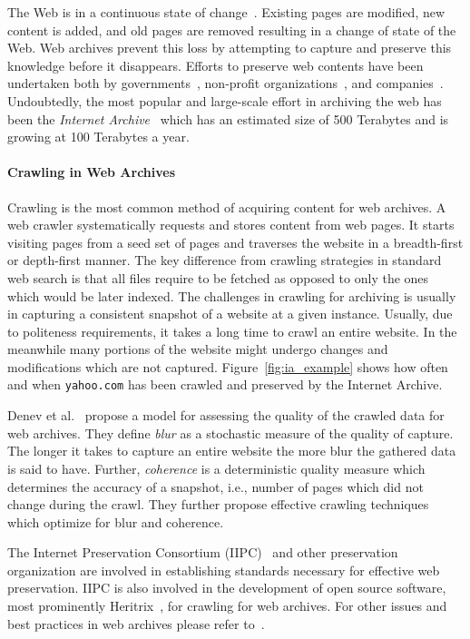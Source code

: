 The Web is in a continuous state of change~\cite{1498837,Cho, 775246}. Existing pages are modified, new content is added, and old pages are removed resulting in a change of state of the Web. Web archives prevent this loss by attempting to capture and preserve this knowledge before it disappears. Efforts to preserve web contents have been undertaken both by governments~\cite{webarchive,netarkivet,bnf,pandora}, non-profit organizations~\cite{IA, IM}, and companies~\cite{HANZO}. Undoubtedly, the most popular and large-scale effort in archiving the web has been the \emph{Internet Archive}~\cite{IA} which has an estimated size of 500 Terabytes and is growing at 100 Terabytes a year. 


\paragraph{Crawling in Web Archives} Crawling is the most common method of acquiring content for web archives. A web crawler systematically requests and stores content from web pages. It starts visiting pages from a seed set of pages and traverses the website in a breadth-first or depth-first manner. The key difference from crawling strategies in standard web search is that all files require to be fetched as opposed to only the ones which would be later indexed. The challenges in crawling for archiving is usually in capturing a consistent snapshot of a website at a given instance. Usually, due to politeness requirements, it takes a long time to crawl an entire website. In the meanwhile many portions of the website might undergo changes and modifications which are not captured. Figure~\ref{fig:ia_example} shows how often and when \texttt{yahoo.com} has been crawled and preserved by the Internet Archive.

Denev et al.~\cite{denev2011sharc} propose a model for assessing the quality of the crawled data for web archives. They define \emph{blur} as a stochastic measure of the quality of capture. The longer it takes to capture an entire website the more blur the gathered data is said to have. Further, \emph{coherence} is a deterministic quality measure which determines the accuracy of a snapshot, i.e., number of pages which did not change during the crawl. They further propose effective crawling techniques which optimize for blur and coherence. 

The Internet Preservation Consortium (IIPC)~\cite{IIPC} and other preservation organization are involved in establishing standards necessary for effective web preservation. IIPC is also involved in the development of open source software, most prominently Heritrix~\cite{digitalHistory:www}, for crawling for web archives. For other issues and best practices in web archives please refer to~\cite{masanes2006web}. 

